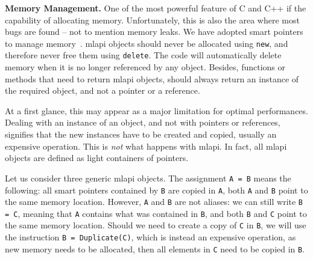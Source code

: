 \documentclass{article}[11pt]
\newcommand{\teuchos}  {{\sc Teuchos}}
\newcommand{\MLAPI}  {{\sc mlapi }}
\newcommand{\MLAPIns}  {{\sc mlapi}}
\begin{document}
\bigskip

\noindent
{\bf Memory Management.} One of the most powerful feature of C and C++
if the capability of allocating memory. Unfortunately, this is also the
area where most bugs are found -- not to mention memory leaks. We have adopted
smart pointers to manage memory~\cite{barlett04teuchos}.
\MLAPI objects should never be allocated using {\tt new}, and therefore never
free them using {\tt delete}. The code will automatically delete memory
when it is no longer referenced by any object. Besides, functions or methods
that need to return \MLAPI objects, should always return an instance of the
required object, and not a pointer or a reference.

\noindent
At a first glance, this may appear as a major limitation for optimal
performances. Dealing with an instance of an object, and not with pointers or
references, signifies that the new instances have to be created and copied,
usually an expensive operation. This is {\sl not} what happens with \MLAPIns. In
fact, all \MLAPI objects are defined as light containers of pointers. 

\noindent
Let us consider three generic \MLAPI objects.
The assignment \verb!A = B! means the following: all smart pointers contained
by \verb!B! are copied in \verb!A!, both \verb!A! and \verb!B! point to the
same memory location. However, \verb!A! and \verb!B! are not aliases: we can
still write \verb!B = C!, meaning that \verb!A! contains what was contained in
\verb!B!, and both \verb!B! and \verb!C! point to the same memory location. 
Should we need to create a copy of \verb!C! in \verb!B!, we will use the
instruction \verb!B = Duplicate(C)!, which is instead an expensive operation, as new memory
needs to be allocated, then all elements in \verb!C! need to be copied in
\verb!B!.

\medskip
\end{document}
